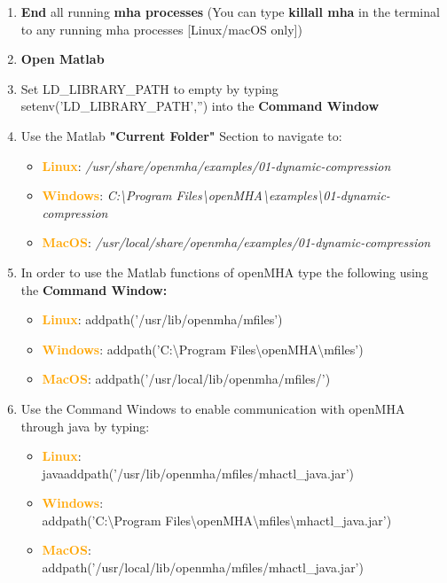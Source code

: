 \documentclass[11pt,a4paper,twoside]{article}
\newcommand{\+}{\discretionary{\mbox{\scriptsize$\hookleftarrow$}}{}{}}
\begin{document}
{{{\begin{enumerate}
\item \textbf{End} all running \textbf{mha processes} (You can type \textbf{killall mha} in the terminal to any running mha processes [Linux/macOS only])
\item \textbf{Open Matlab}
\item Set LD\_LIBRARY\_PATH to empty by typing {\ttfamily setenv('LD\_LIBRARY\_PATH','')} into the \textbf{Command Window}
\item Use the Matlab \textbf{"Current Folder"} Section to navigate to:

\begin{itemize}
\item \textcolor{orange}{\textbf{Linux}}: \textit{/usr/share/openmha/examples/01-dynamic-compression} 
\item \textcolor{orange}{\textbf{Windows}}: \textit{C:\textbackslash Program Files\textbackslash openMHA\textbackslash examples\textbackslash 01-dynamic-compression}
\item \textcolor{orange}{\textbf{MacOS}}: \textit{/usr/local/share/openmha/examples/01-dynamic-compression} 
\end{itemize}

\item In order to use the Matlab functions of openMHA type the following using the \textbf{Command Window:} 

\begin{itemize}
\item \textcolor{orange}{\textbf{Linux}}: {\ttfamily addpath('/usr/lib/openmha/mfiles')}
\item \textcolor{orange}{\textbf{Windows}}: {\ttfamily addpath('C:\textbackslash Program Files\textbackslash openMHA\textbackslash mfiles')}
\item \textcolor{orange}{\textbf{MacOS}}: {\ttfamily addpath('/usr/local/lib/openmha/mfiles/')}
\end{itemize}


\item Use the Command Windows to enable communication with openMHA through java by typing: 

\begin{itemize}
\item \textcolor{orange}{\textbf{Linux}}: \\{\ttfamily javaaddpath('/usr/lib/openmha/mfiles/mhactl\_java.jar')} 
\item \textcolor{orange}{\textbf{Windows}}: \\ {\ttfamily addpath('C:\textbackslash Program Files\textbackslash openMHA\textbackslash mfiles\textbackslash mhactl\_java.jar')}
\item \textcolor{orange}{\textbf{MacOS}}: \\ {\ttfamily addpath('/usr/local/lib/openmha/mfiles/mhactl\_java.jar')}
\end{itemize}


\end{enumerate}}}}
\end{document}
